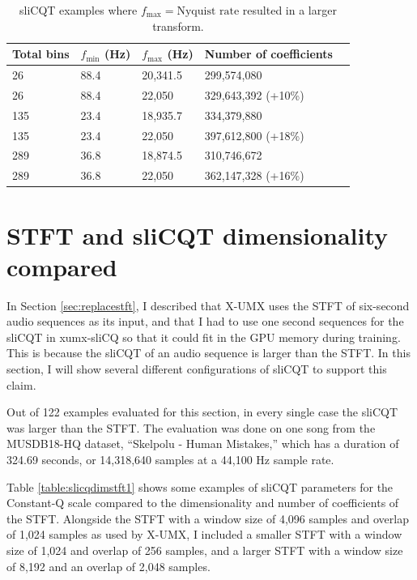 \documentclass[report.tex]{subfiles}
\begin{document}
\begin{appendices}
\begin{table}[ht]
	\centering
	\caption{sliCQT examples where $f_{\text{max}} = \text{Nyquist rate}$ resulted in a larger transform.}
	\label{table:slicqdimdegen2}
\begin{tabular}{ |l|l|l|l|l| }
	 \hline
	 Total bins & $f_{\text{min}}$ (Hz) & $f_{\text{max}}$ (Hz) & Number of coefficients \\
	 \hline
	 26 & 88.4 & 20,341.5 & 299,574,080 \\
	 \hline
	 26 & 88.4 & 22,050 & 329,643,392 (+10\%) \\
	 \hline
	 \hline
	 135 & 23.4 & 18,935.7 & 334,379,880 \\
	 \hline
	 135 & 23.4 & 22,050 & 397,612,800 (+18\%) \\
	 \hline
	 \hline
	 289 & 36.8 & 18,874.5 & 310,746,672 \\
	 \hline
	 289 & 36.8 & 22,050 & 362,147,328 (+16\%) \\
	 \hline
\end{tabular}
\end{table}

\newpagefill

\section{STFT and sliCQT dimensionality compared}
\label{appendix:slicqdim2}

In Section \ref{sec:replacestft}, I described that X-UMX uses the STFT of six-second audio sequences as its input, and that I had to use one second sequences for the sliCQT in xumx-sliCQ so that it could fit in the GPU memory during training. This is because the sliCQT of an audio sequence is larger than the STFT. In this section, I will show several different configurations of sliCQT to support this claim.

Out of 122 examples evaluated for this section, in every single case the sliCQT was larger than the STFT. The evaluation was done on one song from the MUSDB18-HQ dataset, ``Skelpolu - Human Mistakes,'' which has a duration of 324.69 seconds, or 14,318,640 samples at a 44,100 Hz sample rate.

Table \ref{table:slicqdimstft1} shows some examples of sliCQT parameters for the Constant-Q scale compared to the dimensionality and number of coefficients of the STFT. Alongside the STFT with a window size of 4,096 samples and overlap of 1,024 samples as used by X-UMX, I included a smaller STFT with a window size of 1,024 and overlap of 256 samples, and a larger STFT with a window size of 8,192 and an overlap of 2,048 samples.


\end{appendices}
\end{document}
